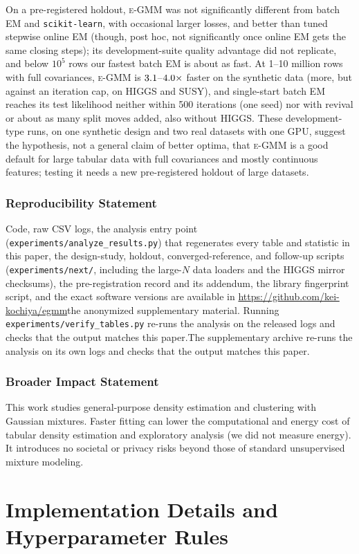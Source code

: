\documentclass[10pt]{article} %
\makeatletter
\newcommand{\egmm}{\textsc{e-GMM}}
\newcommand{\codelink}{\if@accepted\url{https://github.com/kei-kochiya/egmm}\else the anonymized supplementary material\fi}
\newcommand{\verifysentence}{\if@accepted Running \texttt{experiments/verify\_tables.py} re-runs the analysis on the released logs and checks that the output matches this paper.\else The supplementary archive re-runs the analysis on its own logs and checks that the output matches this paper.\fi}
\makeatother
\begin{document}
On a pre-registered holdout, \egmm{} was not significantly different from batch EM and \texttt{scikit-learn}, with occasional larger losses, and better than tuned stepwise online EM (though, post hoc, not significantly once online EM gets the same closing steps); its development-suite quality advantage did not replicate, and below $10^5$ rows our fastest batch EM is about as fast. At 1--10 million rows with full covariances, \egmm{} is $3.1$--$4.0\times$ faster on the synthetic data (more, but against an iteration cap, on HIGGS and SUSY), and single-start batch EM reaches its test likelihood neither within 500 iterations (one seed) nor with revival or about as many split moves added, also without HIGGS. These development-type runs, on one synthetic design and two real datasets with one GPU, suggest the hypothesis, not a general claim of better optima, that \egmm{} is a good default for large tabular data with full covariances and mostly continuous features; testing it needs a new pre-registered holdout of large datasets.

\subsubsection*{Reproducibility Statement}
Code, raw CSV logs, the analysis entry point (\texttt{experiments/analyze\_results.py}) that regenerates every table and statistic in this paper, the design-study, holdout, converged-reference, and follow-up scripts (\texttt{experiments/next/}, including the large-$N$ data loaders and the HIGGS mirror checksums), the pre-registration record and its addendum, the library fingerprint script, and the exact software versions are available in \codelink{}. \verifysentence{}

\subsubsection*{Broader Impact Statement}
This work studies general-purpose density estimation and clustering with Gaussian mixtures. Faster fitting can lower the computational and energy cost of tabular density estimation and exploratory analysis (we did not measure energy). It introduces no societal or privacy risks beyond those of standard unsupervised mixture modeling.




\appendix

\section{Implementation Details and Hyperparameter Rules}
\label{app:impl}
\end{document}
